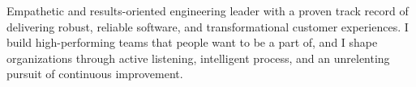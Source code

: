 

\begin{cvparagraph}

Empathetic and results-oriented engineering leader with a proven track record
of delivering robust, reliable software, and transformational customer experiences.
I build high-performing teams that people want to be a part of, and I shape 
organizations through active listening, intelligent process, and an unrelenting 
pursuit of continuous improvement.






\end{cvparagraph}
